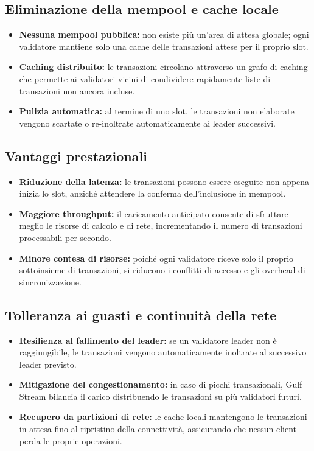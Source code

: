 \documentclass[a4paper,12pt]{report}
\begin{document}
	\subsection{Eliminazione della mempool e cache locale}
	\begin{itemize}
		\item \textbf{Nessuna mempool pubblica:} non esiste più un’area di attesa globale; ogni validatore mantiene solo una cache delle transazioni attese per il proprio slot.
		\item \textbf{Caching distribuito:} le transazioni circolano attraverso un grafo di caching che permette ai validatori vicini di condividere rapidamente liste di transazioni non ancora incluse.
		\item \textbf{Pulizia automatica:} al termine di uno slot, le transazioni non elaborate vengono scartate o re-inoltrate automaticamente ai leader successivi.
	\end{itemize}
	
	\subsection{Vantaggi prestazionali}
	\begin{itemize}
		\item \textbf{Riduzione della latenza:} le transazioni possono essere eseguite non appena inizia lo slot, anziché attendere la conferma dell’inclusione in mempool.
		\item \textbf{Maggiore throughput:} il caricamento anticipato consente di sfruttare meglio le risorse di calcolo e di rete, incrementando il numero di transazioni processabili per secondo.
		\item \textbf{Minore contesa di risorse:} poiché ogni validatore riceve solo il proprio sottoinsieme di transazioni, si riducono i conflitti di accesso e gli overhead di sincronizzazione.
	\end{itemize}
	
	\subsection{Tolleranza ai guasti e continuità della rete}
	\begin{itemize}
		\item \textbf{Resilienza al fallimento del leader:} se un validatore leader non è raggiungibile, le transazioni vengono automaticamente inoltrate al successivo leader previsto.
		\item \textbf{Mitigazione del congestionamento:} in caso di picchi transazionali, Gulf Stream bilancia il carico distribuendo le transazioni su più validatori futuri.
		\item \textbf{Recupero da partizioni di rete:} le cache locali mantengono le transazioni in attesa fino al ripristino della connettività, assicurando che nessun client perda le proprie operazioni.
	\end{itemize}
	
\end{document}
